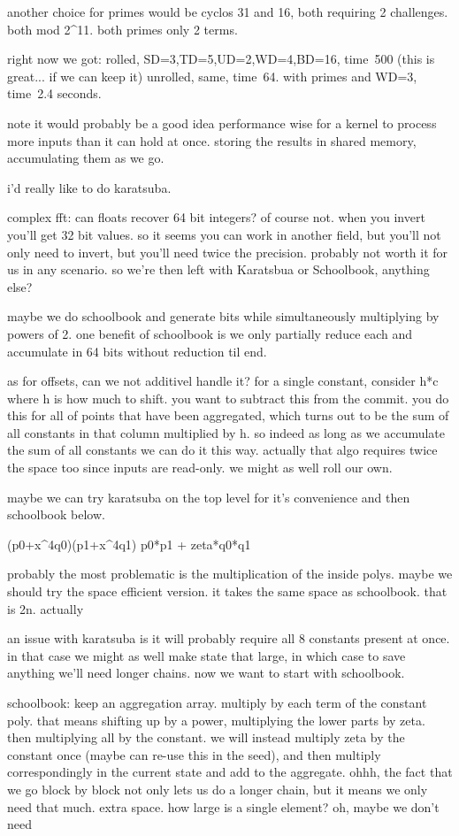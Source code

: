 another choice for primes would be cyclos 31 and 16, both requiring 2 challenges. both mod 2^11. both primes only 2 terms. 


right now we got:
rolled, SD=3,TD=5,UD=2,WD=4,BD=16, time~500 (this is great... if we can keep it)
unrolled, same, time~64. with primes and WD=3, time~2.4 seconds.

note it would probably be a good idea performance wise for a kernel to process more inputs than it can hold at once. storing the results in shared memory, accumulating them as we go. 


i'd really like to do karatsuba.


complex fft:
can floats recover 64 bit integers? of course not. when you invert you'll get 32 bit values.
so it seems you can work in another field, but you'll not only need to invert, but you'll need twice the precision. probably not worth it for us in any scenario.
so we're then left with Karatsbua or Schoolbook, anything else? 

maybe we do schoolbook and generate bits while simultaneously multiplying by powers of 2. 
one benefit of schoolbook is we only partially reduce each and accumulate in 64 bits without reduction til end. 

as for offsets, can we not additivel handle it?
for a single constant, consider h*c where h is how much to shift. you want to subtract this from the commit. you do this for all of points that have been aggregated, which turns out to be the sum of all constants in that column multiplied by h. so indeed as long as we accumulate the sum of all constants we can do it this way. 
actually that algo requires twice the space too since inputs are read-only. we might as well roll our own.

maybe we can try karatsuba on the top level for it's convenience and then schoolbook below.

(p0+x^4q0)(p1+x^4q1)
p0*p1 + zeta*q0*q1

probably the most problematic is the multiplication of the inside polys. 
maybe we should try the space efficient version. it takes the same space as schoolbook. that is 2n.
actually 

an issue with karatsuba is it will probably require all 8 constants present at once. in that case we might as well make state that large, in which case to save anything we'll need longer chains.
now we want to start with schoolbook.

schoolbook:
keep an aggregation array.
multiply by each term of the constant poly.
that means shifting up by a power, multiplying the lower parts by zeta. then multiplying all by the constant.
we will instead multiply zeta by the constant once (maybe can re-use this in the seed), and then multiply correspondingly in the current state and add to the aggregate.
ohhh, the fact that we go block by block not only lets us do a longer chain, but it means we only need that much. extra space. 
how large is a single element? 
oh, maybe we don't need

